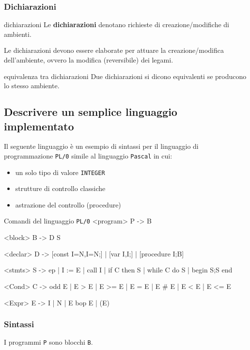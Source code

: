 \subsubsection{Dichiarazioni}
\begin{mydef}{dichiarazioni}
    Le \textbf{dichiarazioni} denotano richieste di creazione/modifiche di ambienti.
\end{mydef}

Le dichiarazioni devono essere elaborate per attuare la creazione/modifica dell'ambiente, ovvero la modifica (reversibile) dei legami.


\begin{mydef}{equivalenza tra dichiarazioni}
    Due dichiarazioni si dicono equivalenti se producono lo stesso ambiente.
\end{mydef}

\subsection{Descrivere un semplice linguaggio implementato}
Il seguente linguaggio è un esempio di sintassi per il linguaggio di programmazione \texttt{PL/0} simile al linguaggio \texttt{Pascal} in cui:
\begin{itemize}[label=$\triangleright$, itemsep=\smallskipamount]
    \item un solo tipo di valore \texttt{INTEGER}
    \item strutture di controllo classiche
    \item astrazione del controllo (procedure)
\end{itemize}

\begin{bnfcode}{Comandi del linguaggio \texttt{PL/0}}
<program>
P -> B

<block>
B -> D S

<declar> 
D -> [const I=N{,I=N};] | [var I{,I};] | [procedure I;B]

<stmts>
S -> ep | I := E | call I | if C then S | while C do S | begin S{;S} end

<Cond>
C -> odd E | E > E | E >= E | E = E | E # E |  E < E | E <= E

<Expr>
E -> I | N | E bop E | (E)
\end{bnfcode}

\subsubsection{Sintassi}
I programmi \texttt{P} sono blocchi \texttt{B}.

